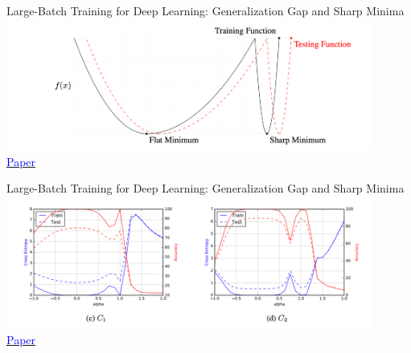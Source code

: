 \documentclass[]{beamer}
\begin{document}
\begin{frame}{Large-Batch Training for Deep Learning: Generalization Gap and Sharp Minima}
\centering
\includegraphics[width=0.9\textwidth]{figures/keskar-flat-minima-concept} \\
\href{https://openreview.net/forum?id=H1oyRlYgg&noteId=H1oyRlYgg}{\textcolor{blue}{Paper}}
\end{frame}

\begin{frame}{Large-Batch Training for Deep Learning: Generalization Gap and Sharp Minima}
\centering
\includegraphics[width=0.9\textwidth]{figures/keskar-parametric-plots} \\
\href{https://openreview.net/forum?id=H1oyRlYgg&noteId=H1oyRlYgg}{\textcolor{blue}{Paper}}
\end{frame}

\end{document}
